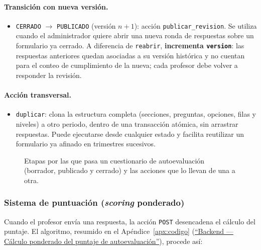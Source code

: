 \paragraph{Transición con nueva versión.}
\begin{itemize}
    \item \texttt{CERRADO} $\rightarrow$ \texttt{PUBLICADO} (versión $n+1$): acción \texttt{publicar\_revision}. Se utiliza cuando el administrador quiere abrir una nueva ronda de respuestas sobre un formulario ya cerrado. A diferencia de \texttt{reabrir}, \textbf{incrementa \texttt{version}}: las respuestas anteriores quedan asociadas a su versión histórica y no cuentan para el conteo de cumplimiento de la nueva; cada profesor debe volver a responder la revisión.
\end{itemize}

\paragraph{Acción transversal.}
\begin{itemize}
    \item \texttt{duplicar}: clona la estructura completa (secciones, preguntas, opciones, filas y niveles) a otro periodo, dentro de una transacción atómica, sin arrastrar respuestas. Puede ejecutarse desde cualquier estado y facilita reutilizar un formulario ya afinado en trimestres sucesivos.
\end{itemize}

\begin{figure}[!htbp]
    \centering
    
    \caption{Etapas por las que pasa un cuestionario de autoevaluación (borrador, publicado y cerrado) y las acciones que lo llevan de una a otra.}
    \label{fig:estados_formulario}
\end{figure}

\subsubsection{Sistema de puntuación (\emph{scoring} ponderado)}\label{subsubsec:scoring}

Cuando el profesor envía una respuesta, la acción \texttt{POST}  desencadena el cálculo del puntaje. El algoritmo, resumido en el Apéndice~\ref{apx:codigo} (\hyperref[lst:scoring]{``Backend --- Cálculo ponderado del puntaje de autoevaluación''}), procede así:

